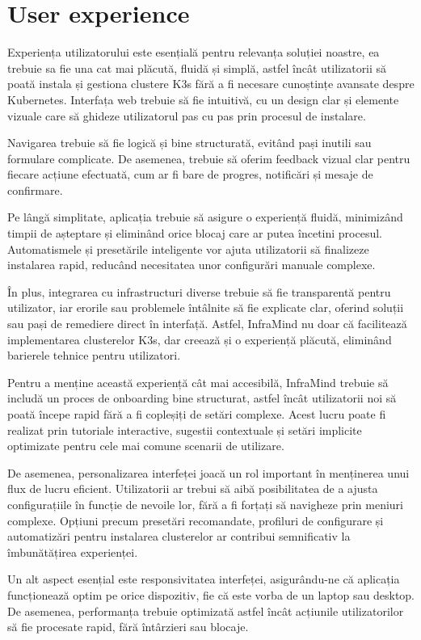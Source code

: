 \documentclass[12pt,a4paper]{report}
\begin{document}
\section{User experience}
Experiența utilizatorului este esențială pentru relevanța soluției noastre, ea trebuie sa fie una cat mai plăcută, fluidă și simplă, astfel încât utilizatorii să poată instala și gestiona clustere K3s fără a fi necesare cunoștințe avansate despre Kubernetes. Interfața web trebuie să fie intuitivă, cu un design clar și elemente vizuale care să ghideze utilizatorul pas cu pas prin procesul de instalare.

Navigarea trebuie să fie logică și bine structurată, evitând pași inutili sau formulare complicate. De asemenea, trebuie să oferim feedback vizual clar pentru fiecare acțiune efectuată, cum ar fi bare de progres, notificări și mesaje de confirmare.

Pe lângă simplitate, aplicația trebuie să asigure o experiență fluidă, minimizând timpii de așteptare și eliminând orice blocaj care ar putea încetini procesul. Automatismele și presetările inteligente vor ajuta utilizatorii să finalizeze instalarea rapid, reducând necesitatea unor configurări manuale complexe.

În plus, integrarea cu infrastructuri diverse trebuie să fie transparentă pentru utilizator, iar erorile sau problemele întâlnite să fie explicate clar, oferind soluții sau pași de remediere direct în interfață. Astfel, InfraMind nu doar că facilitează implementarea clusterelor K3s, dar creează și o experiență plăcută, eliminând barierele tehnice pentru utilizatori.

Pentru a menține această experiență cât mai accesibilă, InfraMind trebuie să includă un proces de onboarding bine structurat, astfel încât utilizatorii noi să poată începe rapid fără a fi copleșiți de setări complexe. Acest lucru poate fi realizat prin tutoriale interactive, sugestii contextuale și setări implicite optimizate pentru cele mai comune scenarii de utilizare.

De asemenea, personalizarea interfeței joacă un rol important în menținerea unui flux de lucru eficient. Utilizatorii ar trebui să aibă posibilitatea de a ajusta configurațiile în funcție de nevoile lor, fără a fi forțați să navigheze prin meniuri complexe. Opțiuni precum presetări recomandate, profiluri de configurare și automatizări pentru instalarea clusterelor ar contribui semnificativ la îmbunătățirea experienței.

Un alt aspect esențial este responsivitatea interfeței, asigurându-ne că aplicația funcționează optim pe orice dispozitiv, fie că este vorba de un laptop sau desktop. De asemenea, performanța trebuie optimizată astfel încât acțiunile utilizatorilor să fie procesate rapid, fără întârzieri sau blocaje.
\end{document}
